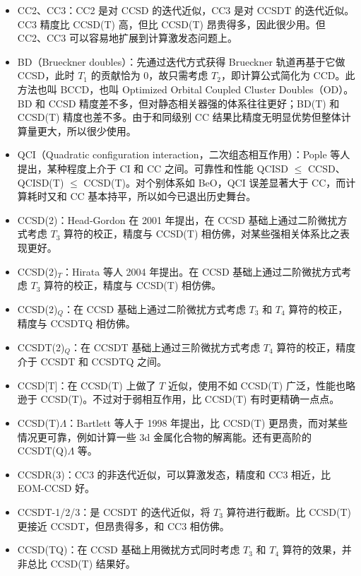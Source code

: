 \begin{itemize}
  \item CC2、CC3：CC2 是对 CCSD 的迭代近似，CC3 是对 CCSDT 的迭代近似。CC3 精度比 CCSD(T) 高，但比 CCSD(T) 昂贵得多，因此很少用。但 CC2、CC3 可以容易地扩展到计算激发态问题上。
  \item BD（Brueckner doubles）：先通过迭代方式获得 Brueckner 轨道再基于它做 CCSD，此时 $T_1$ 的贡献恰为 0，故只需考虑 $T_2$，即计算公式简化为 CCD。此方法也叫 BCCD，也叫 Optimized Orbital Coupled Cluster Doubles（OD）。BD 和 CCSD 精度差不多，但对静态相关器强的体系往往更好；BD(T) 和 CCSD(T) 精度也差不多。由于和同级别 CC 结果比精度无明显优势但整体计算量更大，所以很少使用。
  \item QCI（Quadratic configuration interaction，二次组态相互作用）：Pople 等人提出，某种程度上介于 CI 和 CC 之间。可靠性和性能 QCISD $\le$ CCSD、QCISD(T) $\le$ CCSD(T)。对个别体系如 BeO，QCI 误差显著大于 CC，而计算耗时又和 CC 基本持平，所以如今已退出历史舞台。
  \item CCSD(2)：Head-Gordon 在 2001 年提出，在 CCSD 基础上通过二阶微扰方式考虑 $T_3$ 算符的校正，精度与 CCSD(T) 相仿佛，对某些强相关体系比之表现更好。
  \item CCSD(2)$_T$：Hirata 等人 2004 年提出。在 CCSD 基础上通过二阶微扰方式考虑 $T_3$ 算符的校正，精度与 CCSD(T) 相仿佛。
  \item CCSD(2)$_Q$：在 CCSD 基础上通过二阶微扰方式考虑 $T_3$ 和 $T_4$ 算符的校正，精度与 CCSDTQ 相仿佛。
  \item CCSDT(2)$_Q$：在 CCSDT 基础上通过三阶微扰方式考虑 $T_4$ 算符的校正，精度介于 CCSDT 和 CCSDTQ 之间。
  \item CCSD[T]：在 CCSD(T) 上做了 $T$ 近似，使用不如 CCSD(T) 广泛，性能也略逊于 CCSD(T)。不过对于弱相互作用，比 CCSD(T) 有时更精确一点点。
  \item CCSD(T)$\Lambda$：Bartlett 等人于 1998 年提出，比 CCSD(T) 更昂贵，而对某些情况更可靠，例如计算一些 3d 金属化合物的解离能。还有更高阶的 CCSDT(Q)$\Lambda$ 等。
  \item CCSDR(3)：CC3 的非迭代近似，可以算激发态，精度和 CC3 相近，比 EOM-CCSD 好。
  \item CCSDT-1/2/3：是 CCSDT 的迭代近似，将 $T_3$ 算符进行截断。比 CCSD(T) 更接近 CCSDT，但昂贵得多，和 CC3 相仿佛。
  \item CCSD(TQ)：在 CCSD 基础上用微扰方式同时考虑 $T_3$ 和 $T_4$ 算符的效果，并非总比 CCSD(T) 结果好。
\end{itemize}

